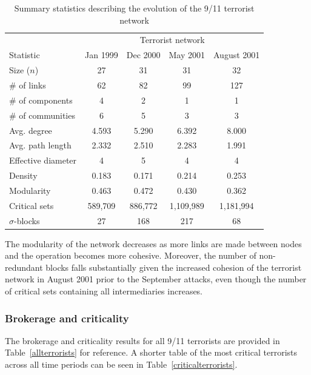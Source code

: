 \begin{table}[h]
\begin{center}
\begin{tabular}{lcccc}
\toprule
& \multicolumn{4}{c}{Terrorist network} \\[1ex]
Statistic			& Jan 1999 	& Dec 2000 	& May 2001 	& August 2001 	\\
\midrule
Size ($n$)         & 27      & 31       & 31         & 32          \\
\# of links        & 62      & 82       & 99         & 127         \\
\# of components   & 4       & 2        & 1          & 1           \\
\# of communities  & 6       & 5        & 3          & 3           \\
Avg. degree        & 4.593   & 5.290    & 6.392      & 8.000       \\
Avg. path length   & 2.332   & 2.510    & 2.283      & 1.991       \\
Effective diameter & 4       & 5        & 4          & 4           \\
Density            & 0.183   & 0.171    & 0.214      & 0.253       \\
Modularity         & 0.463   & 0.472    & 0.430      & 0.362       \\
Critical sets      & 589,709 & 886,772  & 1,109,989  & 1,181,994   \\
$\sigma$-blocks    & 27      & 168      & 217        & 68          \\
\bottomrule
\end{tabular}
\end{center}
\caption{Summary statistics describing the evolution of the 9/11 terrorist network}
\label{TerroristSS}
\end{table}

The modularity of the network decreases as more links are made between nodes and the operation becomes more cohesive. Moreover, the number of non-redundant blocks falls substantially given the increased cohesion of the terrorist network in August 2001 prior to the September attacks, even though the number of critical sets containing all intermediaries increases.

\subsubsection*{Brokerage and criticality}

The brokerage and criticality results for all 9/11 terrorists are provided in Table~\ref{allterrorists} for reference. A shorter table of the most critical terrorists across all time periods can be seen in Table~\ref{criticalterrorists}.

